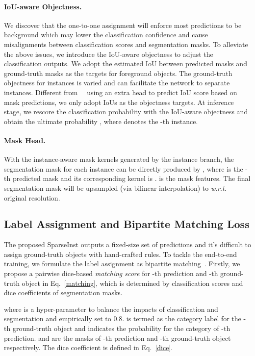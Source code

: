 \documentclass[10pt,twocolumn,letterpaper]{article}
\newcommand{\name}{SparseInst}
\renewcommand{\wrt}{\textit{w}.\textit{r}.\textit{t}. }
\begin{document}
\paragraph{IoU-aware Objectness.}
\label{iou_objectness}
We discover that the one-to-one assignment will enforce most predictions to be background which may lower the classification confidence and cause misalignments between classification scores and segmentation masks.
To alleviate the above issues, we introduce the IoU-aware objectness to adjust the classification outputs.
We adopt the estimated IoU between predicted masks and ground-truth masks as the targets for foreground objects.
The ground-truth objectness for instances is varied and can facilitate the network to separate instances.
Different from ~\cite{MSRCNNHuangHGHW19}~using an extra head to predict IoU score based on mask predictions, we only adopt IoUs as the objectness targets.
At inference stage, we rescore the classification probability  with the IoU-aware objectness  and obtain the ultimate probability , where  denotes the -th instance.

\paragraph{Mask Head.}
With the instance-aware mask kernels  generated by the instance branch, the segmentation mask for each instance can be directly produced by , where  is the -th predicted mask and its corresponding kernel is .  is the mask features. The final segmentation mask will be upsampled (via bilinear interpolation) to  \wrt original resolution.



\subsection{Label Assignment and Bipartite Matching Loss}

The proposed \name{} outputs a fixed-size set of predictions and it's difficult to assign ground-truth objects with hand-crafted rules.
To tackle the end-to-end training, we formulate the label assignment as bipartite matching~\cite{DETRCarionMSUKZ20}.
Firstly, we propose a pairwise dice-based \textit{matching score}  for -th prediction and -th ground-truth object in Eq.~\eqref{matching}, which is determined by classification scores and dice coefficients of segmentation masks.

where  is a hyper-parameter to balance the impacts of classification and segmentation and empirically set to 0.8.  is termed as the category label for the -th ground-truth object and  indicates the probability for the category  of -th prediction.  and  are the masks of -th prediction and -th ground-truth object respectively.
The dice coefficient is defined in Eq.~\eqref{dice}.
\end{document}

